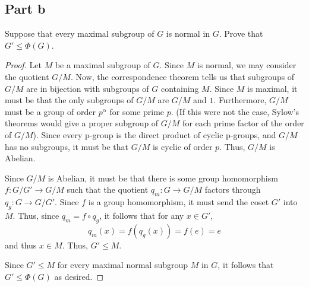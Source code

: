 \documentclass[12pt,reqno]{amsart}
\begin{document}
\subsection*{Part b}
Suppose that every maximal subgroup of $G$ is normal in $G$. Prove that $G'\leq
\Phi(G)$.
\\
\begin{proof}
Let $M$ be a maximal subgroup of $G$. Since $M$ is normal, we may consider the
    quotient $G/M$. Now, the correspondence theorem tells us that subgroups of
    $G/M$ are in bijection with subgroups of $G$ containing $M$. Since $M$ is
    maximal, it must be that the only subgroups of $G/M$ are $G/M$ and $1$.
    Furthermore, $G/M$ must be a group of order $p^{\alpha}$ for some prime $p$.
    (If this were not the case, Sylow's theorems would give a proper subgroup of
    $G/M$ for each prime factor of the order of $G/M$).
    Since every p-group is the direct product of cyclic p-groups, and $G/M$ has
    no subgroups, it must be that $G/M$ is cyclic of order $p$. Thus, $G/M$ is
    Abelian.

    Since $G/M$ is Abelian, it must be that there is some group homomorphism
    $f:G/G'\to G/M$ such that the quotient $q_m:G\to G/M$ factors through
    $q_g:G\to G/G'$.
    Since $f$ is a group homomorphism, it must send the coset $G'$ into $M$. Thus, since
    $q_m = f\circ q_g$, it follows that for any $x\in G'$,
    \[
        q_m(x) = f(q_g(x)) = f(e) = e
    \]
    and thus $x\in M$. Thus, $G'\leq M$.

    Since $G'\leq M$ for every maximal normal subgroup $M$ in $G$, it follows
    that $G'\leq \Phi(G)$ as desired.
\end{proof}
\end{document}
